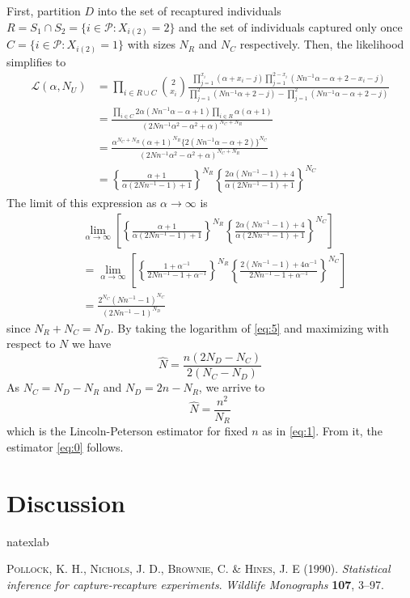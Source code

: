 \documentclass[manuscript]{biometrika}
\begin{document}
First, partition $D$ into the set of recaptured individuals $R = S_1 \cap S_2 = \{i \in \mathcal{P}: X_{i(2)} = 2\}$ and the set of individuals captured only once $C = \{i \in \mathcal{P}: X_{i(2)} = 1\}$ with sizes $N_R$ and $N_C$ respectively. Then, the likelihood simplifies to
\begin{align*}
    \mathcal{L}(\alpha, N_U) &= \prod_{i \in R \cup C} \binom{2}{x_i} \frac{\prod_{j=1}^{x_i} (\alpha + x_i - j)\prod_{j=1}^{2 - x_i} (Nn^{-1} \alpha - \alpha + 2 - x_i - j)}{\prod_{j=1}^2(Nn^{-1} \alpha + 2 - j) - \prod_{j=1}^2 (Nn^{-1} \alpha - \alpha + 2 - j)} \\
    &= \frac{\prod_{i \in C} 2\alpha(Nn^{-1}\alpha - \alpha + 1)\prod_{i \in R} \alpha (\alpha + 1)}{(2Nn^{-1}\alpha^2 - \alpha^2 + \alpha)^{N_C + N_R}} \\
    &= \frac{\alpha^{N_C + N_R}(\alpha + 1)^{N_R}\{2(Nn^{-1}\alpha - \alpha + 2)\}^{N_C}}{(2Nn^{-1}\alpha^2 - \alpha^2 + \alpha)^{N_C + N_R}} \\
    &= \left\{\frac{\alpha + 1}{\alpha(2Nn^{-1} - 1) + 1}\right\}^{N_R} \left\{\frac{2\alpha(Nn^{-1} - 1) + 4}{\alpha(2Nn^{-1} - 1) + 1}\right\}^{N_C}
\end{align*}
The limit of this expression as $\alpha \to \infty$ is
\begin{align} \label{eq:5}
&\lim_{\alpha \to \infty} \left[\left\{\frac{\alpha + 1}{\alpha(2Nn^{-1} - 1) + 1}\right\}^{N_R} \left\{\frac{2\alpha(Nn^{-1} - 1) + 4}{\alpha(2Nn^{-1} - 1) + 1}\right\}^{N_C}\right] \nonumber \\
&= \lim_{\alpha \to \infty} \left[\left\{\frac{1 + \alpha^{-1}}{2Nn^{-1} - 1 + \alpha^{-1}}\right\}^{N_R} \left\{\frac{2(Nn^{-1} - 1) + 4\alpha^{-1}}{2Nn^{-1} - 1 + \alpha^{-1}}\right\}^{N_C}\right] \nonumber \\
&= \frac{2^{N_C}(Nn^{-1} - 1)^{N_C}}{(2Nn^{-1} - 1)^{N_D}}
\end{align}
since $N_R + N_C = N_D$. By taking the logarithm of \eqref{eq:5} and maximizing with respect to $N$ we have
\begin{equation*}
\widehat{N} = \frac{n(2N_D - N_C)}{2(N_C - N_D)}
\end{equation*}
As $N_C = N_D - N_R$ and $N_D = 2n - N_R$, we arrive to
\begin{equation*}
\widehat{N} = \frac{n^2}{N_R}
\end{equation*}
which is the Lincoln-Peterson estimator for fixed $n$ as in \eqref{eq:1}. From it, the estimator \eqref{eq:0} follows.

\section{Discussion}
\begin{thebibliography}{1}
\expandafter\ifx\csname natexlab\endcsname\relax\def\natexlab#1{#1}\fi

\textsc{Pollock, K. H., Nichols, J. D., Brownie, C. \& Hines, J. E} (1990).
\newblock \textit{{Statistical inference for capture-recapture experiments}}.
\newblock \textit{Wildlife Monographs} \textbf{107}, 3--97.

\end{thebibliography}
\end{document}
